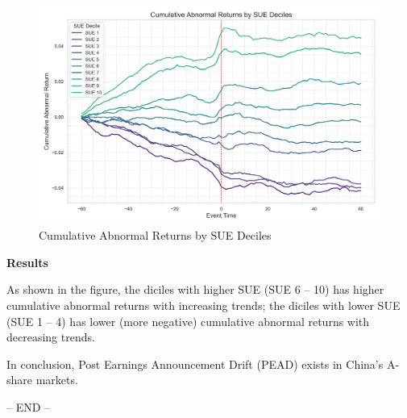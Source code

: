 \begin{figure}[ht]
\centering
\includegraphics[width=1\textwidth]{data/Result Figure.png}
\caption{Cumulative Abnormal Returns by SUE Deciles}
\label{fig:example}
\end{figure}


\noindent
\textbf{Results}

As shown in the figure, the diciles with higher SUE (SUE 6 -- 10) has higher cumulative abnormal returns with increasing trends; the diciles with lower SUE (SUE 1 -- 4) has lower (more negative) cumulative abnormal returns with decreasing trends.

In conclusion, Post Earnings Announcement Drift (PEAD) exists in China’s A-share markets.


\vspace{1.5cm}

\centering -- END --